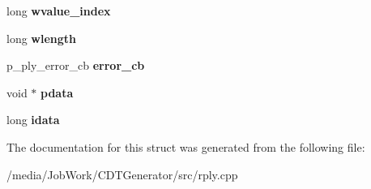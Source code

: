 \begin{DoxyCompactItemize}
\item 
\hypertarget{structt__ply___ad9286509435ac2873054e010dd3675e5}{long {\bfseries wvalue\-\_\-index}}\label{structt__ply___ad9286509435ac2873054e010dd3675e5}

\item 
\hypertarget{structt__ply___ad8ac030b015c75d0cbb14cbb7f899b68}{long {\bfseries wlength}}\label{structt__ply___ad8ac030b015c75d0cbb14cbb7f899b68}

\item 
\hypertarget{structt__ply___a3f9870cbe445137d16da2173363bc810}{p\-\_\-ply\-\_\-error\-\_\-cb {\bfseries error\-\_\-cb}}\label{structt__ply___a3f9870cbe445137d16da2173363bc810}

\item 
\hypertarget{structt__ply___a521769aee8abc386baefd7ffe420276d}{void $\ast$ {\bfseries pdata}}\label{structt__ply___a521769aee8abc386baefd7ffe420276d}

\item 
\hypertarget{structt__ply___af76eed104c6c22769b1a88fa6b0ce73f}{long {\bfseries idata}}\label{structt__ply___af76eed104c6c22769b1a88fa6b0ce73f}

\end{DoxyCompactItemize}


The documentation for this struct was generated from the following file\-:\begin{DoxyCompactItemize}
\item 
/media/\-Job\-Work/\-C\-D\-T\-Generator/src/rply.\-cpp\end{DoxyCompactItemize}
